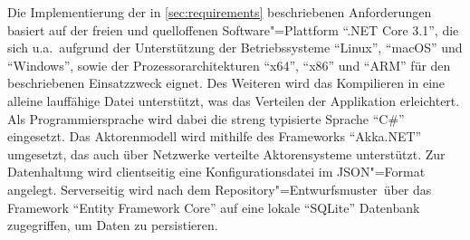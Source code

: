 Die Implementierung der in \autoref{sec:requirements} beschriebenen Anforderungen basiert auf der freien und quelloffenen Software"=Plattform \enquote{.NET Core 3.1}, die sich u.a.\ aufgrund der Unterstützung der Betriebssysteme \enquote{Linux}, \enquote{macOS} und \enquote{Windows}, sowie der Prozessorarchitekturen \enquote{x64}, \enquote{x86} und \enquote{ARM} für den beschriebenen Einsatzzweck eignet.
Des Weiteren wird das Kompilieren in eine alleine lauffähige Datei unterstützt, was das Verteilen der Applikation erleichtert.
Als Programmiersprache wird dabei die streng typisierte Sprache \enquote{C\#} eingesetzt.
Das Aktorenmodell wird mithilfe des Frameworks \enquote{Akka.NET} umgesetzt, das auch über Netzwerke verteilte Aktorensysteme unterstützt.
Zur Datenhaltung wird clientseitig eine Konfigurationsdatei im JSON"=Format angelegt.
Serverseitig wird nach dem Repository"=Entwurfsmuster\unskip\ über das Framework \enquote{Entity Framework Core} auf eine lokale \enquote{SQLite} Datenbank zugegriffen, um Daten zu persistieren.
